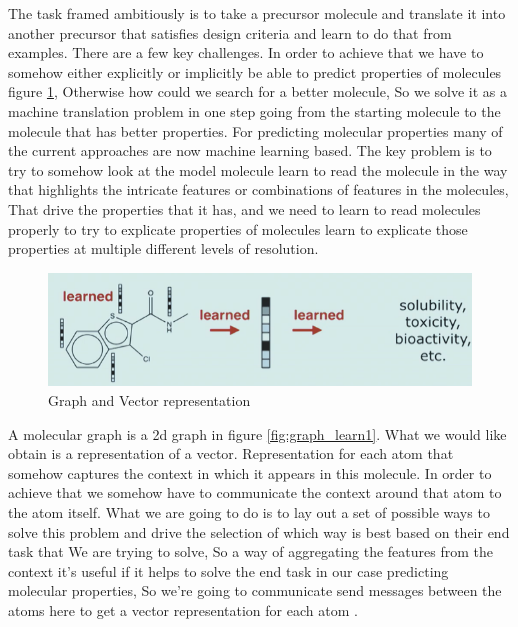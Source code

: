 \documentclass[10pt,twocolumn,letterpaper]{article}
\begin{document}
The task framed ambitiously is to take a precursor molecule and translate it into another precursor that satisfies design criteria and learn to do that from examples. There are a few key challenges. In order to achieve that we have to somehow either explicitly or implicitly be able to predict properties of molecules figure \ref{fig:learn.png}, Otherwise how could we search for a better molecule, So we solve it as a machine translation problem in one step going from the starting molecule to the molecule that has better properties. For predicting molecular properties many of the current approaches are now machine learning based. The key problem is to try to somehow look at the model molecule learn to read the molecule in the way that highlights the intricate features or combinations of features in the molecules, That drive the properties that it has, and we need to learn to read molecules properly to try to explicate properties of molecules learn to explicate those properties at multiple different levels of resolution. 


\begin{figure}[h!]
  \includegraphics[width=\linewidth]{learn.png}
  \caption{Graph and Vector representation }
  \label{fig:learn.png}
\end{figure}



A molecular graph is a 2d graph in figure \ref{fig:graph_learn1}. What we would like obtain is a representation of a vector. Representation for each atom that somehow captures the context in which it appears in this molecule. In order to achieve that we somehow have to communicate the context around that atom to the atom itself. What we are going to do is to lay out a set of possible ways to solve this problem and drive the selection of which way is best based on their end task that We are trying to solve, So a way of aggregating the features from the context it's useful if it helps to solve the end task in our case predicting molecular properties, So we're going to communicate send messages between the atoms here to get a vector representation for each atom \cite{Gilmer2017}.
\end{document}
